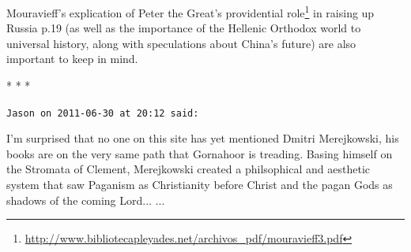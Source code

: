 Mouravieff's explication of Peter the Great's providential role\footnote{\url{http://www.bibliotecapleyades.net/archivos\_pdf/mouravieff3.pdf}} in raising up Russia p.19 (as well as the importance of the Hellenic Orthodox world to universal history, along with speculations about China's future) are also important to keep in mind.



\begin{center}* * *\end{center}

\begin{footnotesize}
\begin{sffamily}
\texttt{Jason on 2011-06-30 at 20:12 said:}

I'm surprised that no one on this site has yet mentioned Dmitri Merejkowski, his books are on the very same path that Gornahoor is treading. Basing himself on the Stromata of Clement, Merejkowski created a philsophical and aesthetic system that saw Paganism as Christianity before Christ and the pagan Gods as shadows of the coming Lord... ... 

\hfill

\end{sffamily}
\end{footnotesize}

